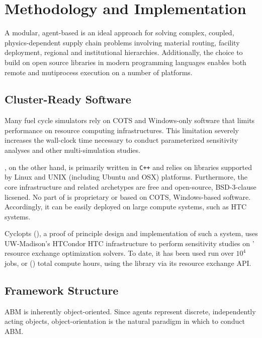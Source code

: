 \section{Methodology and Implementation}

A modular, agent-based is an ideal approach for solving complex, coupled,
physics-dependent supply chain problems involving material routing, facility
deployment, regional and institutional hierarchies. Additionally, the choice to 
build \Cyclus on open source libraries in modern programming languages enables 
both remote and mutiprocess execution on a number of platforms.

\subsection{Cluster-Ready Software}

Many fuel cycle simulators rely on \gls{COTS} and Windows-only software that limits 
performance on resource computing infrastructures. This limitation severely 
increases the wall-clock time necessary to conduct parameterized sensitivity 
analyses and other multi-simulation studies. 

\Cyclus, on the other hand, is primarily written in \texttt{C++} and relies on 
libraries supported by Linux and UNIX (including Ubuntu and OSX) platforms. 
Furthermore, the core infrastructure and related archetypes are free and 
open-source, BSD-3-clause licsened. No part of \Cyclus is proprietary or based 
on \gls{COTS}, Windows-based software. Accordingly, it can be easily deployed 
on large compute systems, such as \acrlong{HTC} systems.

Cyclopts (), a proof of principle design and implementation of such a
system, uses UW-Madison's HTCondor HTC infrastructure to perform sensitivity
studies on \Cyclus' resource exchange optimization solvers. To date, it has been
used run over $10^4$ jobs, or () total compute hours, using
the \Cyclus library via its resource exchange \gls{API}.


\subsection{Framework Structure}

\acrlong{ABM} is inherently object-oriented. Since agents represent 
discrete, independently acting objects, object-orientation is the natural 
paradigm in which to conduct \gls{ABM}.

